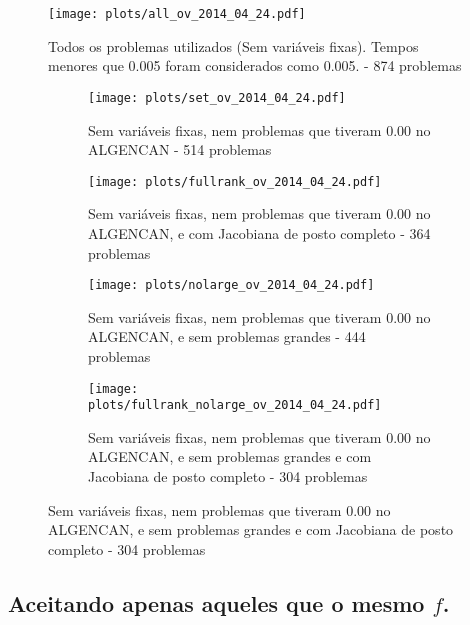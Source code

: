 \documentclass{article}
\begin{document}
\begin{figure}[H]
  \centering
  \texttt{[image: plots/all\_ov\_2014\_04\_24.pdf]}
  \caption{Todos os problemas utilizados (Sem variáveis fixas). Tempos menores
    que 0.005 foram considerados como 0.005. - 874 problemas}
\end{figure}
\begin{figure}[H]
  \centering
  \begin{subfigure}{0.48\textwidth}
    \texttt{[image: plots/set\_ov\_2014\_04\_24.pdf]}
    \caption{Sem variáveis fixas, nem problemas
      que tiveram 0.00 no ALGENCAN - 514 problemas}
  \end{subfigure}
  \begin{subfigure}{0.48\textwidth}
    \texttt{[image: plots/fullrank\_ov\_2014\_04\_24.pdf]}
    \caption{Sem variáveis fixas, nem problemas
      que tiveram 0.00 no ALGENCAN, e com Jacobiana de posto completo - 364
      problemas}
  \end{subfigure}
  \begin{subfigure}{0.48\textwidth}
    \texttt{[image: plots/nolarge\_ov\_2014\_04\_24.pdf]}
    \caption{Sem variáveis fixas, nem problemas
      que tiveram 0.00 no ALGENCAN, e sem problemas grandes - 444 problemas}
  \end{subfigure}
  \begin{subfigure}{0.48\textwidth}
    \texttt{[image: plots/fullrank\_nolarge\_ov\_2014\_04\_24.pdf]}
    \caption{Sem variáveis fixas, nem problemas
      que tiveram 0.00 no ALGENCAN, e sem problemas grandes e com Jacobiana de
      posto completo - 304 problemas}
  \end{subfigure}
\end{figure}

\subsection{Aceitando apenas aqueles que o mesmo $f$. }
\end{document}
